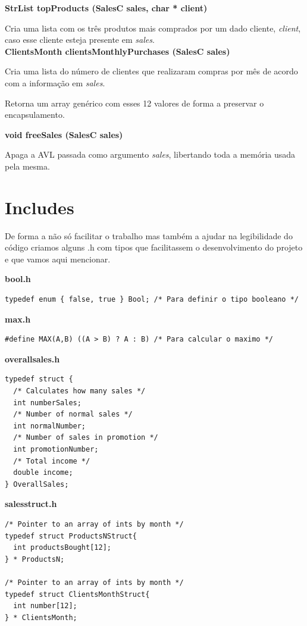 \documentclass[10pt] {article}
\begin{document}
\noindent \textbf {StrList topProducts (SalesC sales, char * client)}
\par Cria uma lista com os três produtos mais comprados por um dado cliente, \emph{client}, caso esse cliente
esteja presente em \emph{sales}. \\

\noindent \textbf {ClientsMonth clientsMonthlyPurchases (SalesC sales)}
\par Cria uma lista do número de clientes que realizaram compras por mês de acordo com a informação em \emph{sales}.
\par Retorna um array genérico com esses 12 valores de forma a preservar o encapsulamento.

\noindent \textbf {void freeSales (SalesC sales)}
\par Apaga a AVL passada como argumento \emph{sales}, libertando toda a memória usada pela mesma. \\

\newpage
\section{Includes}
\par De forma a não só facilitar o trabalho mas também a ajudar na legibilidade do código criamos alguns .h
com tipos que facilitassem o desenvolvimento do projeto e que vamos aqui mencionar.

\textbf{bool.h}
\begin{lstlisting}
typedef enum { false, true } Bool; /* Para definir o tipo booleano */
\end{lstlisting}

\textbf{max.h}
\begin{lstlisting}
#define MAX(A,B) ((A > B) ? A : B) /* Para calcular o maximo */
\end{lstlisting}

\textbf{overallsales.h}
\begin{lstlisting}
typedef struct {
  /* Calculates how many sales */
  int numberSales;
  /* Number of normal sales */
  int normalNumber;
  /* Number of sales in promotion */
  int promotionNumber;
  /* Total income */
  double income;
} OverallSales;
\end{lstlisting}

\textbf{salesstruct.h}
\begin{lstlisting}
/* Pointer to an array of ints by month */
typedef struct ProductsNStruct{
  int productsBought[12];
} * ProductsN;

/* Pointer to an array of ints by month */
typedef struct ClientsMonthStruct{
  int number[12];
} * ClientsMonth;
\end{lstlisting}
\end{document}
